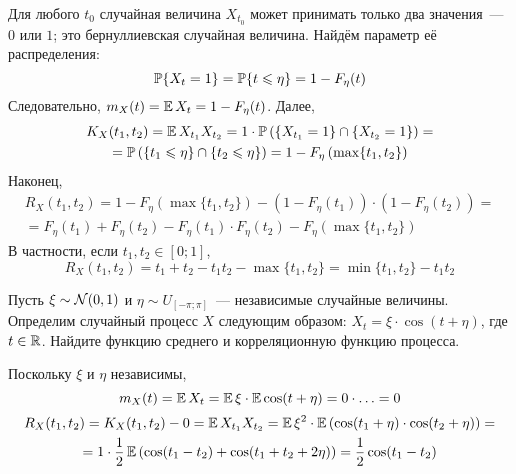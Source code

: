 \begin{Answer}
    \noindent
    Для любого $ t_0 $ случайная величина $ X_{t_0} $ может принимать только два значения~--- $ 0 $ или $ 1 $;
    это бернуллиевская случайная величина.
    Найдём параметр её распределения:
    \[
        \mathbb{P} \{X_t = 1\} = \mathbb{P} \{t \leqslant \eta\} = 1 - F_\eta(t)
    \]
    Следовательно, $ m_X(t) = \operatorname{\mathbb{E}} X_t = 1 - F_\eta(t) $.
    Далее,
    \begin{multline*}
        K_X(t_1, t_2) = \operatorname{\mathbb{E}} X_{t_1} X_{t_2} = 1 \cdot \mathbb{P} \left( \{X_{t_1} = 1\} \cap \{X_{t_2} = 1\} \right) = \\
        = \mathbb{P} \left( \{t_1 \leqslant \eta\} \cap \{t_2 \leqslant \eta\} \right) = 1 - F_\eta\left( \max \{t_1, t_2\} \right)
    \end{multline*}
    Наконец,
    \begin{multline*}
        R_X(t_1, t_2) = 1 - F_\eta\left( \max \{t_1, t_2\} \right) - (1 - F_\eta(t_1)) \cdot (1 - F_\eta(t_2)) = \\
        = F_\eta(t_1) + F_\eta(t_2) - F_\eta(t_1) \cdot F_\eta(t_2) - F_\eta(\max\{t_1, t_2\})
    \end{multline*}
    В частности, если $ t_1, t_2 \in [0; 1] $,
    \[
        R_X(t_1, t_2) = t_1 + t_2 - t_1 t_2 - \max\{t_1, t_2\} = \min\{t_1, t_2\} - t_1 t_2
    \]
\end{Answer}

\begin{Exercise}[counter=SecExercise, label={exercise:basics:cosine_stochastic_process}]
    \noindent
    Пусть $ \xi \sim \mathcal{N}(0, 1) $ и $ \eta \sim U_{[-\pi; \pi]} $~--- независимые случайные величины.
    Определим случайный процесс $ X $ следующим образом: $ X_t = \xi \cdot \cos(t + \eta) $, где $ t \in \mathbb{R} $.
    Найдите функцию среднего и корреляционную функцию процесса.
\end{Exercise}

\begin{Answer}
    \noindent
    Поскольку $ \xi $ и $ \eta $ независимы,
    \[
        m_X(t) = \operatorname{\mathbb{E}} X_t = \operatorname{\mathbb{E}} \xi \cdot \operatorname{\mathbb{E}} \cos(t + \eta) = 0 \cdot \ldots = 0
    \]
    \begin{multline*}
        R_X(t_1, t_2) = K_X(t_1, t_2) - 0 = \operatorname{\mathbb{E}} X_{t_1} X_{t_2} = \operatorname{\mathbb{E}} \xi^2 \cdot \operatorname{\mathbb{E}} \left( \cos(t_1 + \eta) \cdot \cos(t_2 + \eta) \right) = \\
        = 1 \cdot \frac{1}{2} \operatorname{\mathbb{E}} \left( \cos(t_1 - t_2) + \cos(t_1 + t_2 + 2 \eta) \right) = \frac{1}{2} \cos(t_1 - t_2)
    \end{multline*}
\end{Answer}

